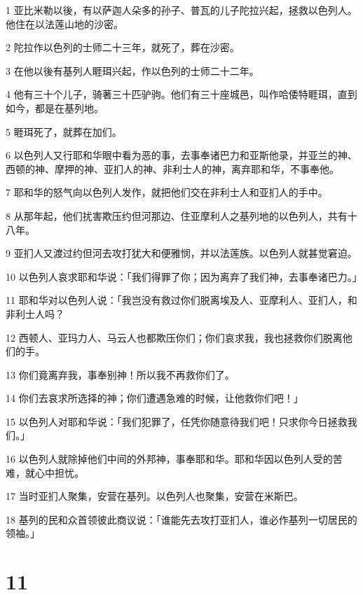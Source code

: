 \par 1 亚比米勒以後，有以萨迦人朵多的孙子、普瓦的儿子陀拉兴起，拯救以色列人。他住在以法莲山地的沙密。
\par 2 陀拉作以色列的士师二十三年，就死了，葬在沙密。
\par 3 在他以後有基列人睚珥兴起，作以色列的士师二十二年。
\par 4 他有三十个儿子，骑著三十匹驴驹。他们有三十座城邑，叫作哈倭特睚珥，直到如今，都是在基列地。
\par 5 睚珥死了，就葬在加们。
\par 6 以色列人又行耶和华眼中看为恶的事，去事奉诸巴力和亚斯他录，并亚兰的神、西顿的神、摩押的神、亚扪人的神、非利士人的神，离弃耶和华，不事奉他。
\par 7 耶和华的怒气向以色列人发作，就把他们交在非利士人和亚扪人的手中。
\par 8 从那年起，他们扰害欺压约但河那边、住亚摩利人之基列地的以色列人，共有十八年。
\par 9 亚扪人又渡过约但河去攻打犹大和便雅悯，并以法莲族。以色列人就甚觉窘迫。
\par 10 以色列人哀求耶和华说：「我们得罪了你；因为离弃了我们神，去事奉诸巴力。」
\par 11 耶和华对以色列人说：「我岂没有救过你们脱离埃及人、亚摩利人、亚扪人，和非利士人吗？
\par 12 西顿人、亚玛力人、马云人也都欺压你们；你们哀求我，我也拯救你们脱离他们的手。
\par 13 你们竟离弃我，事奉别神！所以我不再救你们了。
\par 14 你们去哀求所选择的神；你们遭遇急难的时候，让他救你们吧！」
\par 15 以色列人对耶和华说：「我们犯罪了，任凭你随意待我们吧！只求你今日拯救我们。」
\par 16 以色列人就除掉他们中间的外邦神，事奉耶和华。耶和华因以色列人受的苦难，就心中担忧。
\par 17 当时亚扪人聚集，安营在基列。以色列人也聚集，安营在米斯巴。
\par 18 基列的民和众首领彼此商议说：「谁能先去攻打亚扪人，谁必作基列一切居民的领袖。」

\chapter{11}

